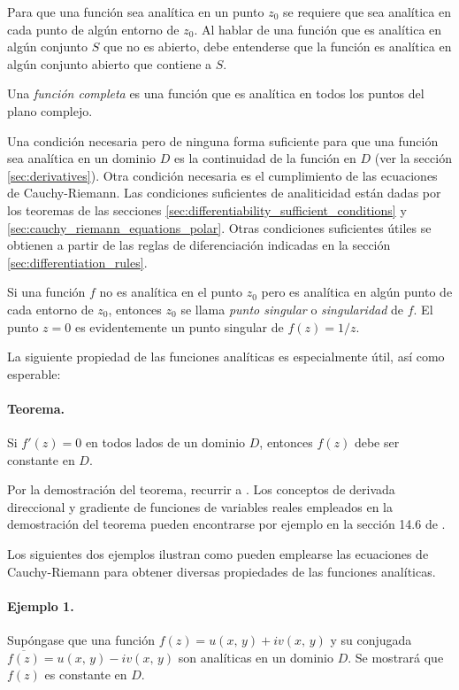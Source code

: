\documentclass[a4paper]{report}
\begin{document}
Para que una función sea analítica en un punto \(z_0\) se requiere que sea analítica en cada punto de algún entorno de \(z_0\). Al hablar de una función que es analítica en algún conjunto \(S\) que no es abierto, debe entenderse que la función es analítica en algún conjunto abierto que contiene a \(S\).

Una \emph{función completa} es una función que es analítica en todos los puntos del plano complejo.

Una condición necesaria pero de ninguna forma suficiente para que una función sea analítica en un dominio \(D\) es la continuidad de la función en \(D\) (ver la sección \ref{sec:derivatives}). Otra condición necesaria es el cumplimiento de las ecuaciones de Cauchy-Riemann. Las condiciones suficientes de analiticidad están dadas por los teoremas de las secciones \ref{sec:differentiability_sufficient_conditions} y \ref{sec:cauchy_riemann_equations_polar}. Otras condiciones suficientes útiles se obtienen a partir de las reglas de diferenciación indicadas en la sección \ref{sec:differentiation_rules}.

Si una función \(f\) no es analítica en el punto \(z_0\) pero es analítica en algún punto de cada entorno de \(z_0\), entonces \(z_0\) se llama \emph{punto singular} o \emph{singularidad} de \(f\). El punto \(z=0\) es evidentemente un punto singular de \(f(z)=1/z\). 

La siguiente propiedad de las funciones analíticas es especialmente útil, así como esperable:
\paragraph{Teorema.} Si \(f'(z)=0\) en todos lados de un dominio \(D\), entonces \(f(z)\) debe ser constante en \(D\).

Por la demostración del teorema, recurrir a \cite{brown2013complex}. Los conceptos de derivada direccional y gradiente de funciones de variables reales empleados en la demostración del teorema pueden encontrarse por ejemplo en la sección 14.6 de \cite{stewart2016multivariable}.

Los siguientes dos ejemplos ilustran como pueden emplearse las ecuaciones de Cauchy-Riemann para obtener diversas propiedades de las funciones analíticas.

\paragraph{Ejemplo 1.} Supóngase que una función \(f(z)=u(x,\,y)+iv(x,\,y)\) y su conjugada \(\overline{f(z)}=u(x,\,y)-iv(x,\,y)\) son analíticas en un dominio \(D\). Se mostrará que \(f(z)\) es constante en \(D\).
\end{document}

